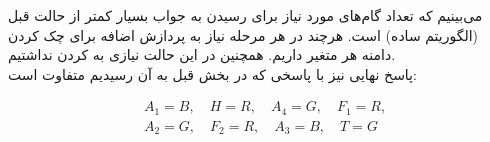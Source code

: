 \begin{ابجد}
می‌بینیم که تعداد گام‌های مورد نیاز برای رسیدن به جواب بسیار کمتر از حالت قبل (الگوریتم  ساده) است. هرچند در هر مرحله نیاز به پردازش اضافه برای چک کردن دامنه هر متغیر داریم. همچنین در این حالت نیازی به  کردن نداشتیم. \\
پاسخ نهایی نیز با پاسخی که در بخش قبل به آن رسیدیم متفاوت است:

\begin{align*}
     & A_1 = B, \quad H = R, \quad A_4 = G, \quad F_1 = R, \\
     & A_2 = G, \quad F_2 = R, \quad A_3 = B, \quad T = G
\end{align*}

\end{ابجد}